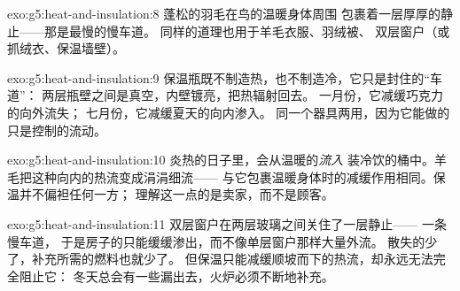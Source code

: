 \begin{solution}{exo:g5:heat-and-insulation:8}
蓬松的羽毛在鸟的温暖身体周围
包裹着一层厚厚的静止——那是最慢的慢车道。
同样的道理也用于羊毛衣服、羽绒被、
双层窗户（或抓绒衣、保温墙壁）。
\end{solution}

\begin{solution}{exo:g5:heat-and-insulation:9}
保温瓶既不制造热，也不制造冷，它只是封住的“车道”：
两层瓶壁之间是真空，内壁镀亮，把热辐射回去。
一月份，它减缓巧克力的向外流失；
七月份，它减缓夏天的向内渗入。
同一个器具两用，因为它能做的只是控制的流动。
\end{solution}

\begin{solution}{exo:g5:heat-and-insulation:10}
炎热的日子里，会从温暖的\emph{流入}
装冷饮的桶中。羊毛把这种向内的热流变成涓涓细流——
与它包裹温暖身体时的减缓作用相同。保温并不偏袒任何一方；
理解这一点的是卖家，而不是顾客。
\end{solution}

\begin{solution}{exo:g5:heat-and-insulation:11}
双层窗户在两层玻璃之间关住了一层静止——
一条慢车道，
于是房子的只能缓缓渗出，而不像单层窗户那样大量外流。
散失的少了，补充所需的燃料也就少了。
但保温只能减缓顺坡而下的热流，却永远无法完全阻止它：
冬天总会有一些漏出去，火炉必须不断地补充。
\end{solution}
